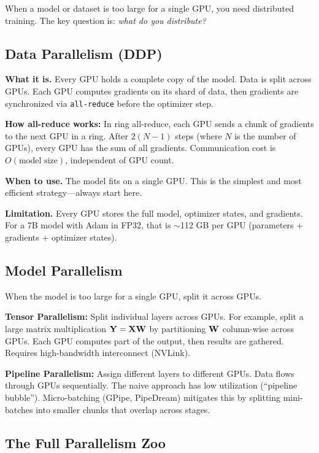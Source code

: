 When a model or dataset is too large for a single GPU, you need distributed training. The key question is: \textit{what do you distribute?}

\subsection{Data Parallelism (DDP)}

\textbf{What it is.} Every GPU holds a complete copy of the model. Data is split across GPUs. Each GPU computes gradients on its shard of data, then gradients are synchronized via \texttt{all-reduce} before the optimizer step.

\textbf{How all-reduce works:} In ring all-reduce, each GPU sends a chunk of gradients to the next GPU in a ring. After $2(N-1)$ steps (where $N$ is the number of GPUs), every GPU has the sum of all gradients. Communication cost is $O(\text{model size})$, independent of GPU count.

\textbf{When to use.} The model fits on a single GPU. This is the simplest and most efficient strategy---always start here.

\textbf{Limitation.} Every GPU stores the full model, optimizer states, and gradients. For a 7B model with Adam in FP32, that is $\sim$112 GB per GPU (parameters + gradients + optimizer states).

\subsection{Model Parallelism}

When the model is too large for a single GPU, split it across GPUs.

\textbf{Tensor Parallelism:} Split individual layers across GPUs. For example, split a large matrix multiplication $\mathbf{Y} = \mathbf{X}\mathbf{W}$ by partitioning $\mathbf{W}$ column-wise across GPUs. Each GPU computes part of the output, then results are gathered. Requires high-bandwidth interconnect (NVLink).

\textbf{Pipeline Parallelism:} Assign different layers to different GPUs. Data flows through GPUs sequentially. The naive approach has low utilization (``pipeline bubble''). Micro-batching (GPipe, PipeDream) mitigates this by splitting mini-batches into smaller chunks that overlap across stages.

\subsection{The Full Parallelism Zoo}
\label{subsec:parallelism_zoo}

